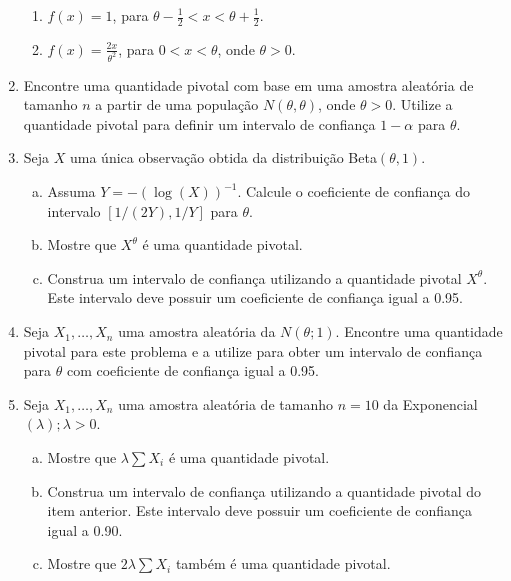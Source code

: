 \documentclass[10pt,brazil,addpoints]{exam}
\begin{document}
\begin{enumerate}[1.]
\begin{enumerate}[\bf (a)]
\item $f(x)=1$, para $\theta-\frac{1}{2}<x<\theta+\frac{1}{2}$.

\item $f(x)=\frac{2x}{\theta^2}$, para $0<x<\theta$, onde $\theta>0$.
\end{enumerate}

\item Encontre uma quantidade pivotal com base em uma amostra aleatória de tamanho $n$ a partir de uma população $N(\theta,\theta)$, onde $\theta>0$. Utilize a quantidade pivotal para definir um intervalo de confiança $1-\alpha$ para $\theta$.

\item Seja $X$ uma única observação obtida da distribuição Beta$(\theta,1)$.

\begin{enumerate}[a)]
\item Assuma $Y = -(\log(X))^{-1}$. Calcule o coeficiente de confiança do intervalo $[1/(2Y), 1/Y]$ para $\theta$. 
\item Mostre que $X^{\theta}$ é uma quantidade pivotal.
\item Construa um intervalo de confiança utilizando a quantidade pivotal $X^{\theta}$. Este intervalo deve
possuir um coeficiente de confiança igual a 0.95.
\end{enumerate}



\item 
Seja $X_1, \ldots, X_n$ uma amostra aleatória da $N(\theta; 1)$. Encontre uma quantidade pivotal para este problema e a utilize para obter um intervalo de confiança para $\theta$ com coeficiente de confiança igual a 0.95.


\item 
Seja $X_1, \ldots, X_n$ uma amostra aleatória de tamanho $n = 10$ da Exponencial$(\lambda); \lambda > 0$.

\begin{enumerate}[a)]
\item Mostre que $\lambda\sum X_i$ é uma quantidade pivotal.
\item Construa um intervalo de confiança utilizando a quantidade pivotal do item anterior. Este intervalo deve possuir um coeficiente de confiança igual a 0.90.
\item Mostre que $2\lambda\sum X_i$ também é uma quantidade pivotal.
\end{enumerate}



\end{enumerate}
\end{document}
